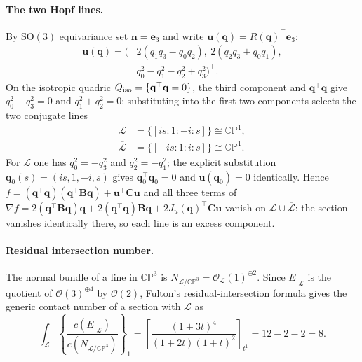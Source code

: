 \paragraph{The two Hopf lines.} By $\mathrm{SO}(3)$ equivariance set $\mathbf n=\mathbf e_3$ and write $\mathbf u(\mathbf q)=R(\mathbf q)^\top\mathbf e_3$:
\begin{equation}
\begin{aligned}
\mathbf u(\mathbf q)=\big(&2(q_1q_3-q_0q_2),\ 2(q_2q_3+q_0q_1),\\
&q_0^2-q_1^2-q_2^2+q_3^2\big)^\top .
\end{aligned}
\end{equation}
On the isotropic quadric $Q_{\rm iso}=\{\mathbf q^\top\mathbf q=0\}$, the third component and $\mathbf q^\top\mathbf q$ give $q_0^2+q_3^2=0$ and $q_1^2+q_2^2=0$; substituting into the first two components selects the two conjugate lines
\begin{equation}
\begin{aligned}
\mathcal L&=\{[i s:1:-i:s]\}\cong\mathbb{CP}^1,\\
\overline{\mathcal L}&=\{[-i s:1:i:s]\}\cong\mathbb{CP}^1 .
\end{aligned}
\end{equation}
For $\mathcal L$ one has $q_0^2=-q_3^2$ and $q_2^2=-q_1^2$; the explicit substitution $\mathbf q_0(s)=(is,1,-i,s)$ gives $\mathbf q_0^\top\mathbf q_0=0$ and $\mathbf u(\mathbf q_0)=0$ identically. Hence $f=(\mathbf q^\top\mathbf q)(\mathbf q^\top\mathbf B\mathbf q)+\mathbf u^\top\mathbf C\mathbf u$ and all three terms of
$\nabla f=2(\mathbf q^\top\mathbf B\mathbf q)\mathbf q+2(\mathbf q^\top\mathbf q)\mathbf B\mathbf q+2J_u(\mathbf q)^\top\mathbf C\mathbf u$
vanish on $\mathcal L\cup\overline{\mathcal L}$: the section vanishes identically there, so each line is an excess component.

\paragraph{Residual intersection number.} The normal bundle of a line in $\mathbb{CP}^3$ is $N_{\mathcal L/\mathbb{CP}^3}=\mathcal O_{\mathcal L}(1)^{\oplus2}$. Since $E|_{\mathcal L}$ is the quotient of $\mathcal O(3)^{\oplus4}$ by $\mathcal O(2)$, Fulton's residual-intersection formula gives the generic contact number of a section with $\mathcal L$ as
\begin{equation}
\int_{\mathcal L}\left\{\frac{c(E|_{\mathcal L})}{c(N_{\mathcal L/\mathbb{CP}^3})}\right\}_1
=\left[\frac{(1+3t)^4}{(1+2t)(1+t)^2}\right]_{t^1}=12-2-2=8 .
\end{equation}

